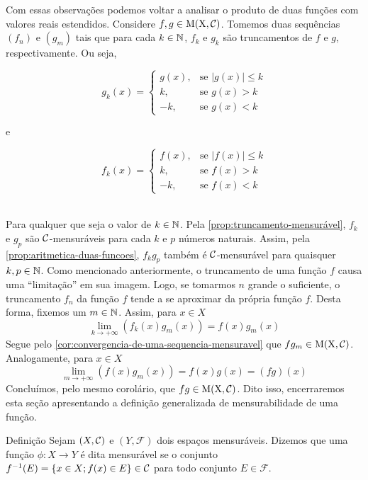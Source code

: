 Com essas observações podemos voltar a analisar o produto de duas funções com valores reais estendidos.
Considere $f,g \in \operatorname{M(X, \mathcal{C} )}$. 
Tomemos duas sequências $(f_n)$ e $(g_m)$ tais que para cada $k \in \operatorname{\mathbb{N}}$, $f_k$ e $g_k$ são truncamentos de $f$ e $g$, respectivamente.
Ou seja,
	\hspace{-0.2cm}
	\begin{minipage}{0.5\linewidth}
	$$ g_k(x) =
	\left\{\begin{array}{cc}
		g(x), & \textrm{se\ } |g(x)| \leq k \\
		k, & \textrm{se\ } g(x) > k \\
		-k, & \textrm{se\ } g(x) < k 
	\end{array}\right.	
	$$	
	\end{minipage}
e
	\begin{minipage}{0.5\linewidth}
		$$ f_k(x) =
		\left\{\begin{array}{cc}
			f(x), & \textrm{se\ } |f(x)| \leq k \\
			k, & \textrm{se\ } f(x) > k \\
			-k, & \textrm{se\ } f(x) < k 
		\end{array}\right.	
		$$	
	\end{minipage}
\\

Para qualquer que seja o valor de $k \in \operatorname{\mathbb{N}}$.
Pela \ref{prop:truncamento-mensurável}, $f_k$ e $g_p$ são $\operatorname{\mathcal{C}}$-mensuráveis para cada $k$ e $p$ números naturais.
Assim, pela \ref{prop:aritmetica-duas-funcoes}, $f_kg_p$ também é $\operatorname{\mathcal{C}}$-mensurável para quaisquer $k, p \in \operatorname{\mathbb{N}}$.
Como mencionado anteriormente, o truncamento de uma função $f$ causa uma \enquote{limitação} em sua imagem.
Logo, se tomarmos $n$ grande o suficiente, o truncamento $f_n$ da função $f$ tende a se aproximar da própria função $f$.
Desta forma, fixemos um $m \in \operatorname{\mathbb{N}}$.
Assim, para $x \in X$
$$
\lim_{k \to +\infty} \left(f_k(x)g_m(x)\right) = f(x)g_m(x) 
$$
Segue pelo \ref{cor:convergencia-de-uma-sequencia-mensuravel} que 
$fg_m \in \operatorname{M(X, \mathcal{C} )}$. 
Analogamente, para $x \in X$
$$
\lim_{m \to +\infty} \left(f(x)g_m(x)\right) 
= f(x)g(x) = (fg)(x)
$$
Concluímos, pelo mesmo corolário, que $fg \in \operatorname{M(X, \mathcal{C} )}$.
Dito isso, encerraremos esta seção apresentando a definição generalizada de mensurabilidade de uma função.

\begin{env}{Definição}
	\label{def:mensurabilidade-geral}
	Sejam $(X, \operatorname{\mathcal{C}})$ e $(Y,\mathcal{F})$ dois espaços mensuráveis.
	Dizemos que uma função $\phi:X \to Y$ é dita mensurável se o conjunto $f^{-1}(E) = \{x \in X; f(x)\in E\} \in \operatorname{\mathcal{C}}$ para todo conjunto $E \in \mathcal{F}$. 
\end{env}


